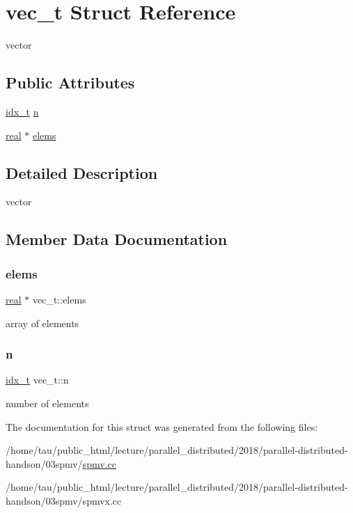 \hypertarget{structvec__t}{}\section{vec\+\_\+t Struct Reference}
\label{structvec__t}


vector  


\subsection*{Public Attributes}
\begin{DoxyCompactItemize}
\item 
\hyperlink{spmv_8cc_a8e93478a00e685bea5e6a3f617bf03a3}{idx\+\_\+t} \hyperlink{structvec__t_a06879ff4054298fbc680b02e3e18da7a}{n}
\item 
\hyperlink{spmv_8cc_a11d147c64891830c9e79b3315b1b2e21}{real} $\ast$ \hyperlink{structvec__t_af9bc087be96662c10187c01cf9bfc834}{elems}
\end{DoxyCompactItemize}


\subsection{Detailed Description}
vector 

\subsection{Member Data Documentation}
\mbox{\label{structvec__t_af9bc087be96662c10187c01cf9bfc834}} 
\subsubsection{\texorpdfstring{elems}{elems}}
{\footnotesize\ttfamily \hyperlink{spmv_8cc_a11d147c64891830c9e79b3315b1b2e21}{real} $\ast$ vec\+\_\+t\+::elems}

array of elements \mbox{\label{structvec__t_a06879ff4054298fbc680b02e3e18da7a}} 
\subsubsection{\texorpdfstring{n}{n}}
{\footnotesize\ttfamily \hyperlink{spmv_8cc_a8e93478a00e685bea5e6a3f617bf03a3}{idx\+\_\+t} vec\+\_\+t\+::n}

number of elements 

The documentation for this struct was generated from the following files\+:\begin{DoxyCompactItemize}
\item 
/home/tau/public\+\_\+html/lecture/parallel\+\_\+distributed/2018/parallel-\/distributed-\/handson/03spmv/\hyperlink{spmv_8cc}{spmv.\+cc}\item 
/home/tau/public\+\_\+html/lecture/parallel\+\_\+distributed/2018/parallel-\/distributed-\/handson/03spmv/spmvx.\+cc\end{DoxyCompactItemize}
